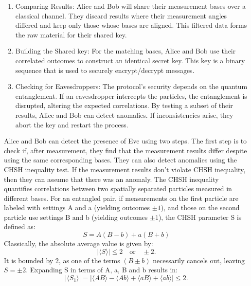 \documentclass[a4paper]{cas-sc}
\begin{document}
\begin{enumerate}
          \begin{figure}[pos=h]
              \centering
              
              \caption{Measurement Direction for Ekert Protocol}
              \label{fig:mesurement_direction}
          \end{figure}

    \item Comparing Results:  Alice and Bob will share their measurement bases over a classical channel. They discard results where their measurement angles differed and keep only those whose bases are aligned. This filtered data forms the raw material for their shared key.
    \item Building the Shared key: For the matching bases, Alice and Bob use their correlated outcomes to construct an identical secret key. This key is a binary sequence that is used to securely encrypt/decrypt messages.
    \item Checking for Eavesdroppers: The protocol's security depends on the quantum entanglement. If an eavesdropper intercepts the particles, the entanglement is disrupted, altering the expected correlations. By testing a subset of their results, Alice and Bob can detect anomalies. If inconsistencies arise, they abort the key and restart the process.
\end{enumerate}

Alice and Bob can detect the presence of Eve using two steps. The first step is to check if, after measurement, they find that the measurement results differ despite using the same corresponding bases. They can also detect anomalies using the CHSH inequality test. If the measurement results don't violate CHSH inequality, then they can assume that there was an anomaly.
The CHSH inequality quantifies correlations between two spatially separated particles measured in different bases. For an entangled pair, if measurements on the first particle are labeled with settings A and a (yielding outcomes $ \pm 1 $), and those on the second particle use settings B and b (yielding outcomes $ \pm 1 $), the CHSH parameter S is defined as:
\begin{equation}
    S = A(B - b) + a(B + b)
\end{equation}
Classically, the absolute average value is given by:
\[
    |\langle S \rangle| \leq 2 \quad \text{or} \quad \pm 2.
\]
It is bounded by 2, as one of the terms \( (B \pm b) \) necessarily cancels out, leaving \( S = \pm 2 \).
Expanding S in terms of A, a, B and b results in:
\[
    \left| \langle S_1 \rangle \right| = \left| \langle AB \rangle - \langle Ab \rangle + \langle aB \rangle + \langle ab \rangle \right| \leq 2.
\]
\end{document}
